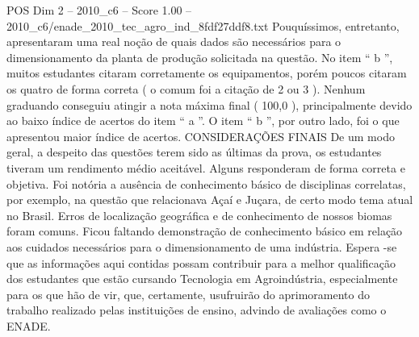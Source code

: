 \begin{textsample}{POS Dim 2 – 2010\_c6 – Score 1.00 – 2010\_c6/enade\_2010\_tec\_agro\_ind\_8fdf27ddf8.txt}
Pouquíssimos, entretanto, apresentaram uma real noção de quais dados são necessários para o dimensionamento da planta de produção solicitada na questão.
No item “ b ”, muitos estudantes citaram corretamente os equipamentos, porém poucos citaram os quatro de forma correta ( o comum foi a citação de 2 ou 3 ).
Nenhum graduando conseguiu atingir a nota máxima final ( 100,0 ), principalmente devido ao baixo índice de acertos do item “ a ”.
O item “ b ”, por outro lado, foi o que apresentou maior índice de acertos.
CONSIDERAÇÕES FINAIS De um modo geral, a despeito das questões terem sido as últimas da prova, os estudantes tiveram um rendimento médio aceitável.
Alguns responderam de forma correta e objetiva.
Foi notória a ausência de conhecimento básico de disciplinas correlatas, por exemplo, na questão que relacionava Açaí e Juçara, de certo modo tema atual no Brasil.
Erros de localização geográfica e de conhecimento de nossos biomas foram comuns.
Ficou faltando demonstração de conhecimento básico em relação aos cuidados necessários para o dimensionamento de uma indústria.
Espera -se que as informações aqui contidas possam contribuir para a melhor qualificação dos estudantes que estão cursando Tecnologia em Agroindústria, especialmente para os que hão de vir, que, certamente, usufruirão do aprimoramento do trabalho realizado pelas instituições de ensino, advindo de avaliações como o ENADE.

\end{textsample}
